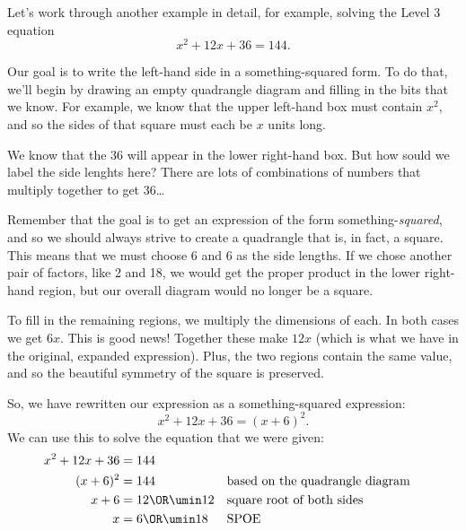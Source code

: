 Let's work through another example in detail, for example, solving the Level 3 equation
\[x^2 + 12x + 36 = 144.\]

Our goal is to write the left-hand side in a something-squared form. To do that, we'll begin by drawing an empty quadrangle diagram and filling in the bits that we know. For example, we know that the upper left-hand box must contain $x^2$, and so the sides of that square must each be $x$ units long.


We know that the 36 will appear in the lower right-hand box. But how sould we label the side lenghts here? There are lots of combinations of numbers that multiply together to get 36\ldots


Remember that the goal is to get an expression of the form something-\textit{squared}, and so we should always strive to create a quadrangle that is, in fact, a square. This means that we must choose 6 and 6 as the side lengths. If we chose another pair of factors, like 2 and 18, we would get the proper product in the lower right-hand region, but our overall diagram would no longer be a square.


To fill in the remaining regions, we multiply the dimensions of each. In both cases we get $6x$. This is good news! Together these make $12x$ (which is what we have in the original, expanded expression). Plus, the two regions contain the same value, and so the beautiful symmetry of the square is preserved.


So, we have rewritten our expression as a something-squared expression:
\[x^2 + 12x + 36 = (x+6)^2.\]
We can use this to solve the equation that we were given:
\begin{align*}
x^2 + 12x + 36 &= 144
\\
(x+6)^2 &= 144
&&\text{based on the quadrangle diagram}
\\
x+6 &= 12 \OR \umin12
&&\text{square root of both sides}
\\
x &= 6 \OR \umin18
&&\text{SPOE}
\end{align*}


